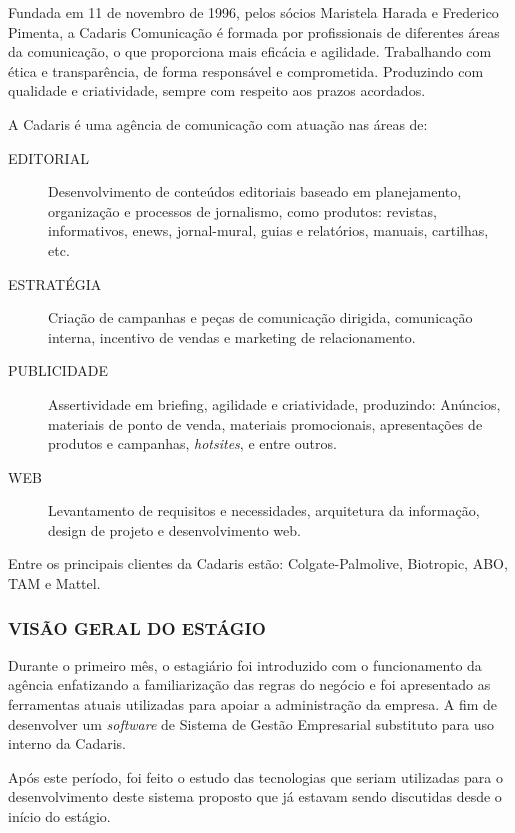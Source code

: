 \documentclass[
  12pt,            %
  openany,
  oneside,
  a4paper,         %
  english,      %
  brazil
]{article}
\numberwithin{figure}{section}
\numberwithin{table}{section}
\begin{document}
Fundada em 11 de novembro de 1996, pelos sócios Maristela Harada e Frederico Pimenta, a Cadaris Comunicação é formada por profissionais de diferentes áreas da comunicação, o que proporciona mais eficácia e agilidade. Trabalhando com ética e transparência, de forma responsável e comprometida. Produzindo com qualidade e criatividade, sempre com respeito aos prazos acordados.

A Cadaris é uma agência de comunicação com atuação nas áreas de:
\vspace{-0.5cm}

\begin{description}
  \item [EDITORIAL]   Desenvolvimento de conteúdos editoriais baseado em planejamento, organização e processos de jornalismo, como produtos: revistas, informativos, enews, jornal-mural, guias e relatórios, manuais, cartilhas, etc.
  \item [ESTRATÉGIA]  Criação de campanhas e peças de comunicação dirigida, comunicação interna, incentivo de vendas e marketing de relacionamento.
  \item [PUBLICIDADE] Assertividade em briefing, agilidade e criatividade, produzindo: Anúncios, materiais de ponto de venda, materiais promocionais, apresentações de produtos e campanhas, \textit{hotsites}, e entre outros.
  \item [WEB]         Levantamento de requisitos e necessidades, arquitetura da informação, design de projeto e desenvolvimento web.
\end{description}

Entre os principais clientes da Cadaris estão: Colgate-Palmolive, Biotropic, ABO, TAM e Mattel.


\subsubsection{VISÃO GERAL DO ESTÁGIO}

Durante o primeiro mês, o estagiário foi introduzido com o funcionamento da agência enfatizando a familiarização das regras do negócio e foi apresentado as ferramentas atuais utilizadas para apoiar a administração da empresa. A fim de desenvolver um \textit{software} de Sistema de Gestão Empresarial substituto para uso interno da Cadaris.

Após este período, foi feito o estudo das tecnologias que seriam utilizadas para o desenvolvimento deste sistema proposto que já estavam sendo discutidas desde o início do estágio.
\end{document}
